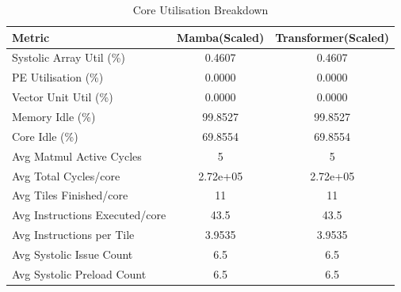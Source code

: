 \begin{table}[h]\centering
    \caption{Core Utilisation Breakdown}
    \label{tab:core_utilisation}
    \begin{tabular}{lcc}\hline
    Metric & Mamba(Scaled) & Transformer(Scaled) \\\hline
        Systolic Array Util (\%) & 0.4607 & 0.4607 \\
    PE Utilisation (\%) & 0.0000 & 0.0000 \\
    Vector Unit Util (\%) & 0.0000 & 0.0000 \\
    Memory Idle (\%) & 99.8527 & 99.8527 \\
    Core Idle (\%) & 69.8554 & 69.8554 \\
    Avg Matmul Active Cycles & 5 & 5 \\
    Avg Total Cycles/core & 2.72e+05 & 2.72e+05 \\
    Avg Tiles Finished/core & 11 & 11 \\
    Avg Instructions Executed/core & 43.5 & 43.5 \\
    Avg Instructions per Tile & 3.9535 & 3.9535 \\
    Avg Systolic Issue Count & 6.5 & 6.5 \\
    Avg Systolic Preload Count & 6.5 & 6.5 \\
\hline\end{tabular}\end{table}
